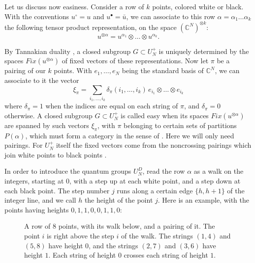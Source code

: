 \documentclass[11pt,a4paper]{article}
\begin{document}
Let us discuss now easiness. Consider a row of $k$ points, colored white or black. With the conventions $u^\circ=u$ and $u^\bullet=\bar u$, we can associate to this row $\alpha=\alpha_1\ldots\alpha_k$ the following tensor product representation, on the space $(\mathbb C^N)^{\otimes k}$:
\[
 u^{\otimes\alpha}=u^{\alpha_1}\otimes\ldots\otimes u^{\alpha_k}.
\]

By Tannakian duality \cite{wor}, a closed subgroup $G\subset U_N^+$ is uniquely determined by the spaces $Fix(u^{\otimes\alpha})$ of fixed vectors of these representations. Now let $\pi$ be a pairing of our $k$ points. With $e_1,\ldots,e_N$ being the standard basis of $\mathbb C^N$, we can associate to it the vector
\[
 \xi_\pi=\sum_{i_1,\ldots,i_k}\delta_\pi(i_1,\ldots,i_k)\,e_{i_1}\otimes\ldots\otimes e_{i_k}
\]
where $\delta_\pi=1$ when the indices are equal on each string of $\pi$, and $\delta_\pi=0$ otherwise. A closed subgroup $G\subset U_N^+$ is called easy when its spaces $Fix(u^{\otimes\alpha})$ are spanned by such vectors $\xi_\pi$, with $\pi$ belonging to certain sets of partitions $P(\alpha)$, which must form a category in the sense of \cite{bs,tw}. Here we will only need pairings. For $U_N^+$ itself the fixed vectors come from the noncrossing pairings which join white points to black points \cite{bs,tw}.

In order to introduce the quantum groups $U_N^D$, read the row $\alpha$ as a walk on the integers, starting at $0$, with a step up at each white point, and a step down at each black point. The step number $j$ runs along a certain edge $\{h,h+1\}$ of the integer line, and we call $h$ the height of the point $j$. Here is an example, with the points having heights $0,1,1,0,0,1,1,0$:

\begin{figure}[H]\centering
{}
\caption{A row of 8 points, with its walk below, and a pairing of it. The point $i$ is right above the step $i$ of the walk. The strings $(1,4)$ and $(5,8)$ have height $0$, and the strings $(2,7)$ and $(3,6)$ have height $1$. Each string of height $0$ crosses each string of height $1$.}
\label{pairing-walk}
\end{figure}
\end{document}
